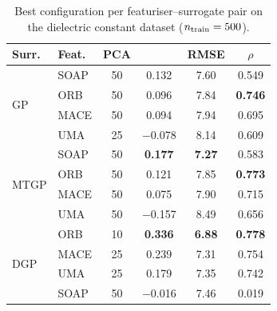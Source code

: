 \begin{table}[H]
    \centering
    \caption{Best configuration per featuriser--surrogate pair on the dielectric constant dataset ($n_{\text{train}} = 500$).}
    \label{tab:best_configs_dielectric}
    \footnotesize
    \begin{tabular}{@{}llcccc@{}}
        \toprule
        \textbf{Surr.} & \textbf{Feat.} & \textbf{PCA} & \textbf{\Rtwo{}} & \textbf{RMSE} & \textbf{$\rho$} \\
        \midrule
        \multirow{4}{*}{GP}
        & SOAP    & 50 & 0.132 & 7.60 & 0.549 \\
        & ORB     & 50 & 0.096 & 7.84 & \textbf{0.746} \\
        & MACE    & 50 & 0.094 & 7.94 & 0.695 \\
        & UMA     & 25 & $-$0.078 & 8.14 & 0.609 \\
        \midrule
        \multirow{4}{*}{MTGP}
        & SOAP    & 50 & \textbf{0.177} & \textbf{7.27} & 0.583 \\
        & ORB     & 50 & 0.121 & 7.85 & \textbf{0.773} \\
        & MACE    & 50 & 0.075 & 7.90 & 0.715 \\
        & UMA     & 50 & $-$0.157 & 8.49 & 0.656 \\
        \midrule
        \multirow{4}{*}{DGP}
        & ORB     & 10 & \textbf{0.336} & \textbf{6.88} & \textbf{0.778} \\
        & MACE    & 25 & 0.239 & 7.31 & 0.754 \\
        & UMA     & 25 & 0.179 & 7.35 & 0.742 \\
        & SOAP    & 50 & $-$0.016 & 7.46 & 0.019 \\
        \bottomrule
    \end{tabular}
\end{table}

